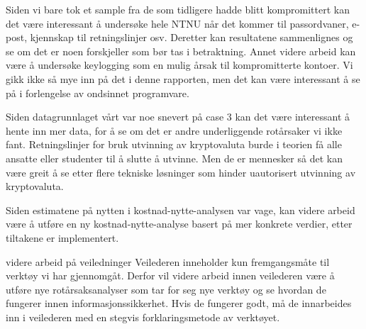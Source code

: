 Siden vi bare tok et sample fra de som tidligere hadde blitt kompromittert kan det være interessant å undersøke hele NTNU når det kommer til passordvaner, e-post, kjennskap til retningslinjer osv. Deretter kan resultatene sammenlignes og se om det er noen forskjeller som bør tas i betraktning. Annet videre arbeid kan være å undersøke keylogging som en mulig årsak til kompromitterte kontoer. Vi gikk ikke så mye inn på det i denne rapporten, men det kan være interessant å se på i forlengelse av ondsinnet programvare. 

Siden datagrunnlaget vårt var noe snevert på case 3 kan det være interessant å hente inn mer data, for å se om det er andre underliggende rotårsaker vi ikke fant. Retningslinjer for bruk utvinning av kryptovaluta burde i teorien få alle ansatte eller studenter til å slutte å utvinne. Men de er mennesker så det kan være greit å se etter flere tekniske løsninger som hinder uautorisert utvinning av kryptovaluta. 

Siden estimatene på nytten i kostnad-nytte-analysen var vage, kan videre arbeid være å utføre en ny kostnad-nytte-analyse basert på mer konkrete verdier, etter tiltakene er implementert. 

videre arbeid på veiledninger
Veilederen inneholder kun fremgangsmåte til verktøy vi har gjennomgåt. Derfor vil videre arbeid innen veilederen være å utføre nye rotårsaksanalyser som tar for seg nye verktøy og se hvordan de fungerer innen informasjonssikkerhet. Hvis de fungerer godt, må de innarbeides inn i veilederen med en stegvis forklaringsmetode av verktøyet.